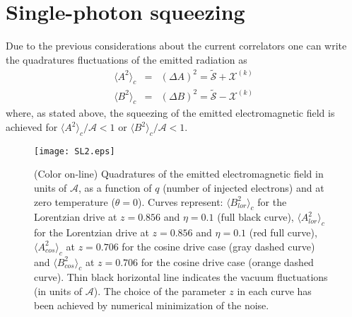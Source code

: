\documentclass[twocolumn,showpacs,preprintnumbers,amsmath,amssymb%
 aps,
 prb,
 lengthcheck,%
]{revtex4-1}
\def\beq{\begin{eqnarray}}
\def\eeq{\end{eqnarray}}
\begin{document}
\section{Single-photon squeezing}\label{single_photon}
Due to the previous considerations about the current correlators one can write the quadratures fluctuations of the emitted radiation as \cite{gasse_observation_2013}
\beq
\langle A^{2} \rangle_{c}&=&(\Delta A)^{2}=\tilde{\mathcal{S}}+\mathcal{X}^{(k)}
\label{squeezing_noise1}\\
\langle B^{2} \rangle_{c}&=&(\Delta B)^{2}=\tilde{\mathcal{S}}-\mathcal{X}^{(k)}
\label{squeezing_noise2}
\eeq
where, as stated above, the squeezing of the emitted electromagnetic field is achieved for $\langle A^{2} \rangle_{c}/\mathcal{A}<1$ or $\langle B^{2} \rangle_{c}/\mathcal{A}<1$.
\begin{figure}[h]
\centering
\texttt{[image: SL2.eps]}
\caption{(Color on-line) Quadratures of the emitted electromagnetic field in units of $\mathcal{A}$, as a function of $q$ (number of injected electrons) and at zero temperature ($\theta=0$). Curves represent: $\langle B^{2}_{lor} \rangle_{c}$ for the Lorentzian drive at $z=0.856$ and $\eta=0.1$ (full black curve), $\langle A^{2}_{lor} \rangle_{c}$ for the Lorentzian drive at $z=0.856$ and $\eta=0.1$ (red full curve), $\langle A^{2}_{cos} \rangle_{c}$ at $z=0.706$ for the cosine drive case (gray dashed curve) and $\langle B^{2}_{cos} \rangle_{c}$ at $z=0.706$ for the cosine drive case (orange dashed curve). Thin black horizontal line indicates the vacuum fluctuations (in units of $\mathcal{A}$). The choice of the parameter $z$ in each curve has been achieved by numerical minimization of the noise.} 
\label{fig2}
\end{figure}
\end{document}
